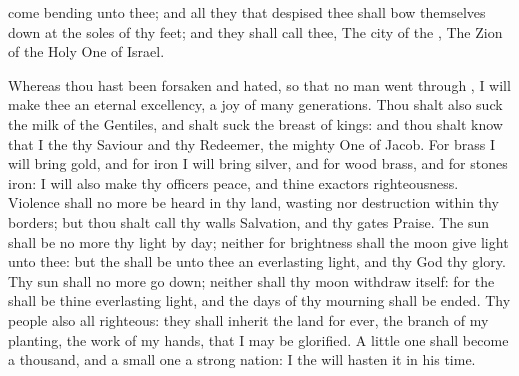 {come
bending unto thee; and all they that
despised thee shall bow themselves
down at the
soles of thy
feet; and they shall
call thee, The
city of the
{}, The
Zion of the Holy
One of
Israel.
\par }{\PP {}Whereas thou hast been
forsaken and
hated, so that no man went
through
{}, I will
make thee an
eternal
excellency, a
joy of
many
generations.
Thou shalt also
suck the
milk of the
Gentiles, and shalt
suck the
breast of
kings: and thou shalt
know that I the
{}
{} thy
Saviour and thy
Redeemer, the mighty
One of
Jacob.
For
brass I will
bring
gold, and for
iron I will
bring
silver, and for
wood
brass, and for
stones
iron: I will also
make thy
officers
peace, and thine
exactors
righteousness.
Violence shall no more be
heard in thy
land,
wasting nor
destruction within thy
borders; but thou shalt
call thy
walls
Salvation, and thy
gates
Praise.
The
sun shall be no more thy
light by
day; neither for
brightness shall the
moon give
light unto thee: but the
{} shall be unto thee an
everlasting
light, and thy
God thy
glory.
Thy
sun shall no more go
down; neither shall thy
moon
withdraw itself: for the
{} shall be thine
everlasting
light, and the
days of thy
mourning shall be
ended.
Thy
people also
{} all
righteous: they shall
inherit the
land for
ever, the
branch of my
planting, the
work of my
hands, that I may be
glorified.
A little
one shall become a
thousand, and a small
one a
strong
nation: I the
{} will
hasten it in his
time.

}
